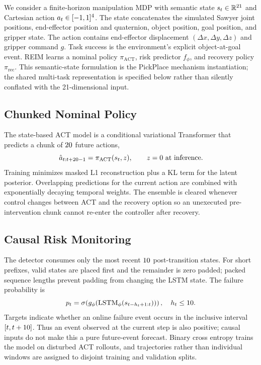 \documentclass[conference]{IEEEtran}
\newcommand{\policyact}{\pi_{\mathrm{ACT}}}
\newcommand{\policyrec}{\pi_{\mathrm{rec}}}
\begin{document}
We consider a finite-horizon manipulation MDP with semantic state
$s_t\in\mathbb{R}^{21}$ and Cartesian action
$a_t\in[-1,1]^{4}$. The state concatenates the simulated Sawyer
joint positions, end-effector position and quaternion, object position, goal
position, and gripper state. The action contains end-effector displacement
$(\Delta x,\Delta y,\Delta z)$ and gripper command $g$. Task success is the
environment's explicit object-at-goal event. REIM learns a nominal policy
$\policyact$, risk predictor $f_\phi$, and recovery policy $\policyrec$. This
semantic-state formulation is the PickPlace mechanism instantiation; the shared
multi-task representation is specified below rather than silently conflated
with the 21-dimensional input.

\subsection{Chunked Nominal Policy}

The state-based ACT model is a conditional variational Transformer that
predicts a chunk of $20$ future actions,
\begin{equation}
  \hat a_{t:t+\ACTChunkLength-1}
  = \policyact(s_t,z), \qquad z=0 \text{ at inference}.
\end{equation}
Training minimizes masked L1 reconstruction plus a KL term for the latent
posterior. Overlapping predictions for the current action are combined with
exponentially decaying temporal weights. The ensemble is cleared whenever
control changes between ACT and the recovery option so an unexecuted
pre-intervention chunk cannot re-enter the controller after recovery.

\subsection{Causal Risk Monitoring}

The detector consumes only the most recent $10$ post-transition
states. For short prefixes, valid states are placed first and the remainder is
zero padded; packed sequence lengths prevent padding from changing the LSTM
state. The failure probability is
\begin{equation}
  p_t = \sigma\!\left(
  g_\phi\!\left(\operatorname{LSTM}_\phi
  (s_{t-h_t+1:t})\right)\right),
  \quad h_t\leq 10 .
\end{equation}
Targets indicate whether an online failure event occurs in the inclusive
interval $[t,t+10]$. Thus an event observed at the current
step is also positive; causal inputs do not make this a pure future-event
forecast. Binary cross entropy trains the model on disturbed ACT rollouts, and
trajectories rather than individual windows are assigned to disjoint training
and validation splits.
\end{document}
